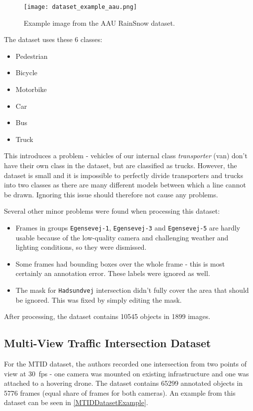 \begin{figure}[h]
    \centering
    \texttt{[image: dataset\_example\_aau.png]}
    \caption{Example image from the AAU RainSnow dataset.}
    \label{AAUDatasetExample}
\end{figure}

The dataset uses these 6 classes:
\begin{itemize}
    \item Pedestrian
    \item Bicycle
    \item Motorbike
    \item Car
    \item Bus
    \item Truck
\end{itemize}
This introduces a problem - vehicles of our internal class \textit{transporter}
(van) don't have their own class in the dataset, but are classified as trucks.
However, the dataset is small and it is impossible to perfectly divide
transporters and trucks into two classes as there are many different models
between which a line cannot be drawn.  Ignoring this issue should therefore not
cause any problems.

Several other minor problems were found when processing this dataset:
\begin{itemize}
    \item Frames in groups \verb|Egensevej-1|, \verb|Egensevej-3| and
    \verb|Egensevej-5| are hardly usable because of the low-quality camera and
    challenging weather and lighting conditions, so they were dismissed.
    \item Some frames had bounding boxes over the whole frame - this is most
    certainly an annotation error. These labels were ignored as well.
    \item The mask for \verb|Hadsundvej| intersection didn't fully cover the
    area that should be ignored. This was fixed by simply editing the mask.
\end{itemize}

After processing, the dataset contains \num{10545} objects in \num{1899} images.


\subsection{Multi-View Traffic Intersection Dataset}

For the MTID dataset, the authors \cite{Jensen2020} recorded one intersection
from two points of view at \SI{30}{fps} - one camera was mounted on existing
infrastructure and one was attached to a hovering drone. The dataset contains
\num{65299} annotated objects in \num{5776} frames (equal share of frames for
both cameras). An example from this dataset can be seen in
\autoref{MTIDDatasetExample}.

